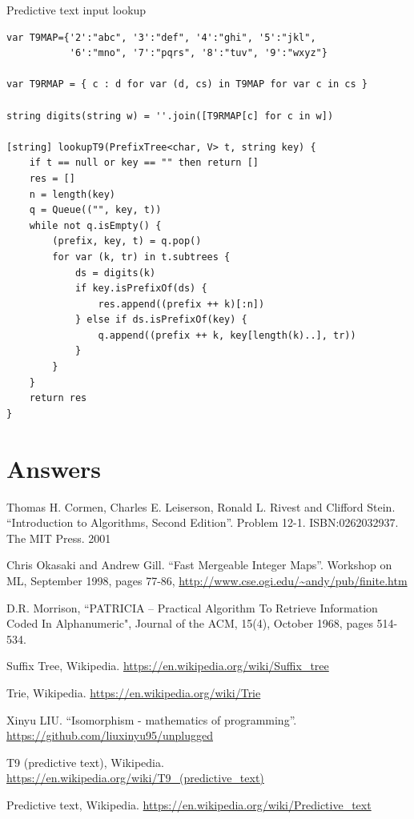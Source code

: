 \documentclass[b5paper]{article}
\begin{document}
Predictive text input lookup
\begin{lstlisting}[language = Bourbaki]
var T9MAP={'2':"abc", '3':"def", '4':"ghi", '5':"jkl",
           '6':"mno", '7':"pqrs", '8':"tuv", '9':"wxyz"}

var T9RMAP = { c : d for var (d, cs) in T9MAP for var c in cs }

string digits(string w) = ''.join([T9RMAP[c] for c in w])

[string] lookupT9(PrefixTree<char, V> t, string key) {
    if t == null or key == "" then return []
    res = []
    n = length(key)
    q = Queue(("", key, t))
    while not q.isEmpty() {
        (prefix, key, t) = q.pop()
        for var (k, tr) in t.subtrees {
            ds = digits(k)
            if key.isPrefixOf(ds) {
                res.append((prefix ++ k)[:n])
            } else if ds.isPrefixOf(key) {
                q.append((prefix ++ k, key[length(k)..], tr))
            }
        }
    }
    return res
}
\end{lstlisting}

\ifx\wholebook\relax \else
\section{Answers}
\shipoutAnswer

\begin{thebibliography}{99}

Thomas H. Cormen, Charles E. Leiserson, Ronald L. Rivest and Clifford Stein.
``Introduction to Algorithms, Second Edition''. Problem 12-1. ISBN:0262032937. The MIT Press. 2001

Chris Okasaki and Andrew Gill. ``Fast Mergeable Integer
Maps''. Workshop on ML, September 1998, pages 77-86, \url{http://www.cse.ogi.edu/~andy/pub/finite.htm}

D.R. Morrison, ``PATRICIA -- Practical Algorithm To Retrieve  Information Coded In Alphanumeric", Journal of the ACM, 15(4), October 1968, pages 514-534.

Suffix Tree, Wikipedia. \url{https://en.wikipedia.org/wiki/Suffix_tree}

Trie, Wikipedia. \url{https://en.wikipedia.org/wiki/Trie}

Xinyu LIU. ``Isomorphism - mathematics of programming''. \url{https://github.com/liuxinyu95/unplugged}

T9 (predictive text), Wikipedia. \url{https://en.wikipedia.org/wiki/T9_(predictive_text)}

Predictive text,
Wikipedia. \url{https://en.wikipedia.org/wiki/Predictive_text}

\end{thebibliography}

\expandafter\enddocument
\fi
\end{document}
